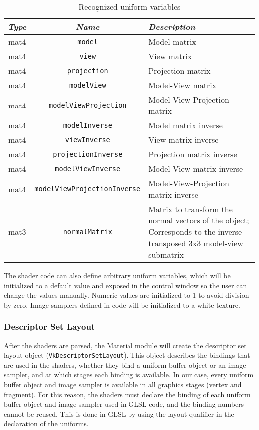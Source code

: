 \begin{table}[h]
    \centering
    \caption{Recognized uniform variables}
    \begin{tabular}{|c|c|p{6cm}|}
        \hline
        \textit{Type} & \textit{Name} & \textit{Description} \\
        \hline
        \hline
        mat4 & \texttt{model} & Model matrix \\
        mat4 & \texttt{view} & View matrix \\
        mat4 & \texttt{projection} & Projection matrix \\
        mat4 & \texttt{modelView} & Model-View matrix \\
        mat4 & \texttt{modelViewProjection} & Model-View-Projection matrix \\
        mat4 & \texttt{modelInverse} & Model matrix inverse \\
        mat4 & \texttt{viewInverse} & View matrix inverse \\
        mat4 & \texttt{projectionInverse} & Projection matrix inverse \\
        mat4 & \texttt{modelViewInverse} & Model-View matrix inverse \\
        mat4 & \texttt{modelViewProjectionInverse} & Model-View-Projection matrix inverse \\
        mat3 & \texttt{normalMatrix} & Matrix to transform the normal vectors of the object; Corresponds to the inverse transposed 3x3 model-view submatrix \\
        \hline
    \end{tabular}
    \label{tab:uniform_variables}
\end{table}

The shader code can also define arbitrary uniform variables, which will be initialized to a default value and exposed in the control window so the user can change the values manually. Numeric values are initialized to 1 to avoid division by zero. Image samplers defined in code will be initialized to a white texture.

\subsubsection{Descriptor Set Layout}
After the shaders are parsed, the Material module will create the descriptor set layout object (\texttt{VkDescriptorSetLayout}). This object describes the bindings that are used in the shaders, whether they bind a uniform buffer object or an image sampler, and at which stages each binding is available. In our case, every uniform buffer object and image sampler is available in all graphics stages (vertex and fragment). For this reason, the shaders must declare the binding of each uniform buffer object and image sampler used in GLSL code, and the binding numbers cannot be reused. This is done in GLSL by using the layout qualifier in the declaration of the uniforms.

